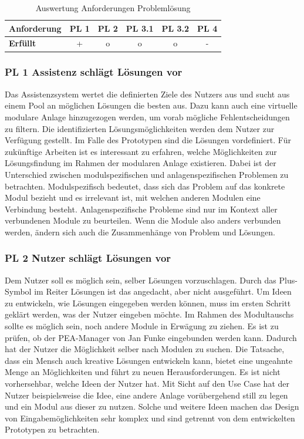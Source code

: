 \begin{table}[htb]
\caption{Auswertung Anforderungen Problemlösung}
\centering
\begin{tabular}{l|c|c|c|c|c}
\textbf{Anforderung} & PL 1 & PL 2 & PL 3.1 & PL 3.2 & PL 4 \\
\hline
\textbf{Erfüllt} & + & o & o & o & - \\
\end{tabular}
\label{tab:Anforderungen-Problemlösung}
\end{table}

\subsubsection*{PL 1 Assistenz schlägt Lösungen vor}
Das Assistenzsystem wertet die definierten Ziele des Nutzers aus und sucht aus einem Pool an möglichen Lösungen die besten  aus. Dazu kann auch eine virtuelle modulare Anlage hinzugezogen werden, um vorab mögliche Fehlentscheidungen zu filtern. Die identifizierten Lösungsmöglichkeiten werden dem Nutzer zur Verfügung gestellt. Im Falle des Prototypen sind die Lösungen vordefiniert. Für zukünftige Arbeiten ist es interessant zu erfahren, welche Möglichkeiten zur Lösungsfindung im Rahmen der modularen Anlage existieren. Dabei ist der Unterschied zwischen modulspezifischen und anlagenspezifischen Problemen zu betrachten. Modulspezifisch bedeutet, dass sich das Problem auf das konkrete Modul bezieht und es irrelevant ist, mit welchen anderen Modulen eine Verbindung besteht. Anlagenspezifische Probleme sind nur im Kontext aller verbundenen Module zu beurteilen. Wenn die Module also anders verbunden werden, ändern sich auch die Zusammenhänge von Problem und Lösungen.

\subsubsection*{PL 2 Nutzer schlägt Lösungen vor}
Dem Nutzer soll es möglich sein, selber Lösungen vorzuschlagen. Durch das Plus-Symbol im Reiter Lösungen ist das angedacht, aber nicht ausgeführt. Um Ideen zu entwickeln, wie Lösungen eingegeben werden können, muss im ersten Schritt geklärt werden, was der Nutzer eingeben möchte. Im Rahmen des Modultauschs sollte es möglich sein, noch andere Module in Erwägung zu ziehen. Es ist zu prüfen, ob der PEA-Manager von Jan Funke \cite{Funke2018} eingebunden werden kann. Dadurch hat der Nutzer die Möglichkeit selber nach Modulen zu suchen. Die Tatsache, dass ein Mensch auch kreative Lösungen entwickeln kann, bietet eine ungeahnte Menge an Möglichkeiten und führt zu neuen Herausforderungen. Es ist nicht vorhersehbar, welche Ideen der Nutzer hat. Mit Sicht auf den Use Case hat der Nutzer beispielsweise die Idee, eine andere Anlage vorübergehend still zu legen und ein Modul aus dieser zu nutzen. Solche und weitere Ideen machen das Design von Eingabemöglichkeiten sehr komplex und sind getrennt von dem entwickelten Prototypen zu betrachten.

